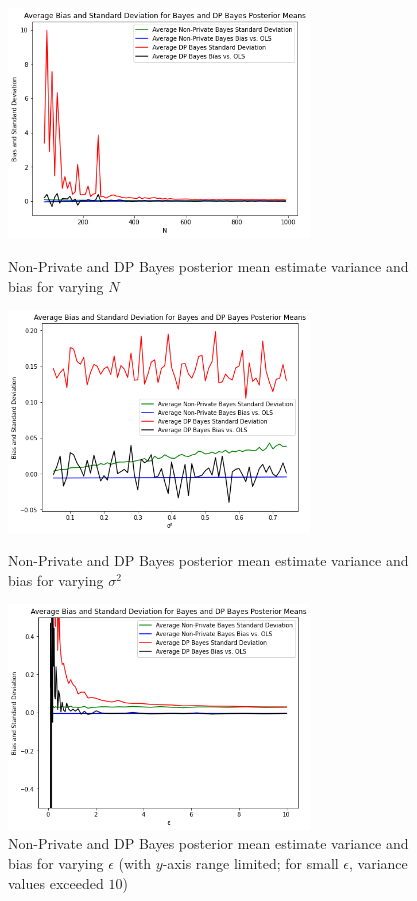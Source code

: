 \documentclass[11pt,conference]{IEEEtran}
\begin{document}
\begin{figure}[htbp]
\centerline{\includegraphics[width=8cm]{plots/bayes_N.png}}
\caption{Non-Private and DP Bayes posterior mean estimate variance and bias for varying $N$} \bigskip
\centerline{\includegraphics[width=8cm]{plots/bayes_variance.png}}
\caption{Non-Private and DP Bayes posterior mean estimate variance and bias for varying $\sigma^2$} \bigskip
\centerline{\includegraphics[width=8cm]{plots/bayes_epsilon_zoom.png}}
\caption{Non-Private and DP Bayes posterior mean estimate variance and bias for varying $\epsilon$ (with $y$-axis range limited; for small $\epsilon$, variance values exceeded $10$)} \bigskip
\label{fig}
\end{figure}
\end{document}
